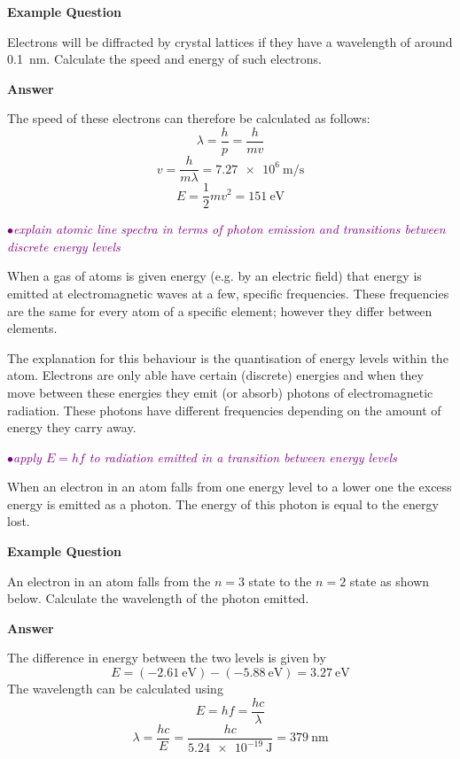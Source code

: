 \documentclass[a4paper,11pt,twoside]{memoir}
\newcounter{spec}[chapter]
\newcommand{\spec}[1]{\Needspace{5\baselineskip}\textcolor{purple}{$\bullet$\hspace{0.5cm}\textit{#1}}}
\newcommand{\answer}{\par \textbf{Answer} \par}
\newenvironment{example}
{\begin{lrbox}{\examplebox}\begin{minipage}{0.9\textwidth}\textbf{Example Question}\par}
{\end{minipage}\end{lrbox}\fbox{\usebox{\examplebox}}}
\begin{document}
\begin{example}
Electrons will be diffracted by crystal lattices if they have a wavelength of around \SI{0.1}{\nano\metre}. Calculate the speed and energy of such electrons.

\answer
The speed of these electrons can therefore be calculated as follows:
\[ \lambda = \frac{h}{p} = \frac{h}{mv} \]
\[ v = \frac{h}{m\lambda} = \SI{7.27e6}{\meter\per\second} \]
\[ E = \frac{1}{2}mv^2 = \SI{151}{\electronvolt} \]

\end{example}

\spec{explain atomic line spectra in terms of photon emission and transitions between discrete energy levels}

When a gas of atoms is given energy (e.g. by an electric field) that energy is emitted at electromagnetic waves at a few, specific frequencies. These frequencies are the same for every atom of a specific element; however they differ between elements. %

The explanation for this behaviour is the quantisation of energy levels within the atom. Electrons are only able have certain (discrete) energies and when they move between these energies they emit (or absorb) photons of electromagnetic radiation. These photons have different frequencies depending on the amount of energy they carry away.

\spec{apply $E = hf$ to radiation emitted in a transition between energy levels}

When an electron in an atom falls from one energy level to a lower one the excess energy is emitted as a photon. The energy of this photon is equal to the energy lost.

\begin{example}
  An electron in an atom falls from the $n=3$ state to the $n=2$ state as shown below. Calculate the wavelength of the photon emitted.
  \begin{center}
  \end{center}

  \answer
  The difference in energy between the two levels is given by
  \[ E = \left(\SI{-2.61}{\electronvolt}\right) - \left(\SI{-5.88}{\electronvolt}\right) = \SI{3.27}{\electronvolt} \]
  The wavelength can be calculated using
  \[ E = hf = \frac{hc}{\lambda} \]
  \[ \lambda = \frac{hc}{E} = \frac{hc}{\SI{5.24e-19}{\joule}} = \SI{379}{\nano\meter} \]
\end{example}
\end{document}
